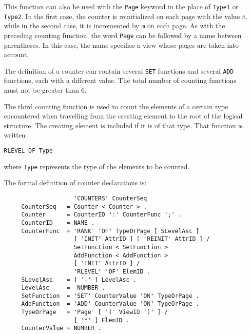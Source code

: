 This function can also be used with the {\tt Page} keyword in the
place of {\tt Type1} or {\tt Type2}.  In the first case, the counter
is reinitialized on each page with the value {\tt n}, while in the
second case, it is incremented by {\tt m} on each page.  As with the
preceding counting function, the word {\tt Page} can be followed by a
name between parentheses.  In this case, the name specifies a view
whose pages are taken into account.

The definition of a counter can contain several {\tt SET} functions
and several {\tt ADD} functions, each with a different value.  The
total number of counting functions must not be greater than 6.

The third counting function is used to count the elements of a
certain type encountered when travelling from the creating element
to the root of the logical structure.  The creating element is
included if it is of that type.  That function is written
\begin{verbatim}
RLEVEL OF Type
\end{verbatim}
where {\tt Type} represents the type of the elements to be counted.

The formal definition of counter declarations is:

\begin{verbatim}
                    'COUNTERS' CounterSeq
     CounterSeq   = Counter < Counter > .
     Counter      = CounterID ':' CounterFunc ';' .
     CounterID    = NAME .
     CounterFunc  = 'RANK' 'OF' TypeOrPage [ SLevelAsc ]
                    [ 'INIT' AttrID ] [ 'REINIT' AttrID ] /
                    SetFunction < SetFunction >
                    AddFunction < AddFunction >
                    [ 'INIT' AttrID ] /
                    'RLEVEL' 'OF' ElemID .
     SLevelAsc    = [ '-' ] LevelAsc .
     LevelAsc     =  NUMBER .
     SetFunction  = 'SET' CounterValue 'ON' TypeOrPage .
     AddFunction  = 'ADD' CounterValue 'ON' TypeOrPage .
     TypeOrPage   = 'Page' [ '(' ViewID ')' ] / 
                    [ '*' ] ElemID .
     CounterValue = NUMBER .
\end{verbatim}

